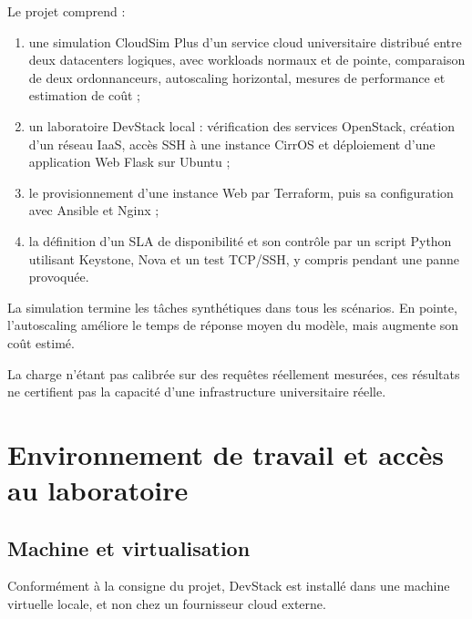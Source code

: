 \documentclass[11pt,a4paper]{article}
\begin{document}
Le projet comprend :
\begin{enumerate}
  \item une simulation CloudSim Plus d'un service cloud universitaire distribué entre deux datacenters logiques, avec workloads normaux et de pointe, comparaison de deux ordonnanceurs, autoscaling horizontal, mesures de performance et estimation de coût ;
  \item un laboratoire DevStack local : vérification des services OpenStack, création d'un réseau IaaS, accès SSH à une instance CirrOS et déploiement d'une application Web Flask sur Ubuntu ;
  \item le provisionnement d'une instance Web par Terraform, puis sa configuration avec Ansible et Nginx ;
  \item la définition d'un SLA de disponibilité et son contrôle par un script Python utilisant Keystone, Nova et un test TCP/SSH, y compris pendant une panne provoquée.
\end{enumerate}

La simulation termine les tâches synthétiques dans tous les scénarios. En pointe, l'autoscaling améliore le temps de réponse moyen du modèle, mais augmente son coût estimé.

\begin{remarque}
La charge n'étant pas calibrée sur des requêtes réellement mesurées, ces résultats ne certifient pas la capacité d'une infrastructure universitaire réelle.
\end{remarque}

\clearpage

\setcounter{section}{-1}
\section{Environnement de travail et accès au laboratoire}

\subsection{Machine et virtualisation}
Conformément à la consigne du projet, DevStack est installé dans une machine virtuelle locale, et non chez un fournisseur cloud externe.
\end{document}
